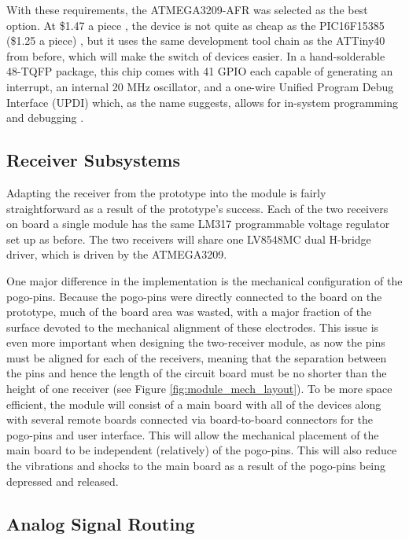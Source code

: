 \documentclass{article}
\begin{document}
	With these requirements, the ATMEGA3209-AFR was selected as the best option.  At \$1.47 a piece \cite{ATMEGA3209_digikey}, the device is not quite as cheap as the PIC16F15385 (\$1.25 a piece) \cite{PIC16F_datasheet}, but it uses the same development tool chain as the ATTiny40 from before, which will make the switch of devices easier.  In a hand-solderable 48-TQFP package, this chip comes with 41 GPIO each capable of generating an interrupt, an internal 20 MHz oscillator, and a one-wire Unified Program Debug Interface (UPDI) which, as the name suggests, allows for in-system programming and debugging \cite{ATMEGA3209_datasheet}.

	\subsection{Receiver Subsystems}

	Adapting the receiver from the prototype into the module is fairly straightforward as a result of the prototype's success.  Each of the two receivers on board a single module has the same LM317 programmable voltage regulator set up as before.  The two receivers will share one LV8548MC dual H-bridge driver, which is driven by the ATMEGA3209.

	One major difference in the implementation is the mechanical configuration of the pogo-pins.  Because the pogo-pins were directly connected to the board on the prototype, much of the board area was wasted, with a major fraction of the surface devoted to the mechanical alignment of these electrodes.  This issue is even more important when designing the two-receiver module, as now the pins must be aligned for each of the receivers, meaning that the separation between the pins and hence the length of the circuit board must be no shorter than the height of one receiver (see Figure \ref{fig:module_mech_layout}).  To be more space efficient, the module will consist of a main board with all of the devices along with several remote boards connected via board-to-board connectors for the pogo-pins and user interface.  This will allow the mechanical placement of the main board to be independent (relatively) of the pogo-pins.  This will also reduce the vibrations and shocks to the main board as a result of the pogo-pins being depressed and released.

	\subsection{Analog Signal Routing}
\end{document}
